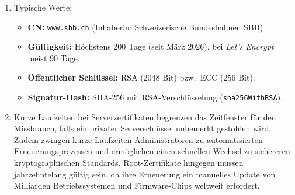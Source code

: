\begin{myexercise}
\begin{myanswer}
\begin{enumerate}
\begin{itemize}
			      \end{itemize}
			\item Typische Werte:
			      \begin{itemize}
				      \item \textbf{\gls{CN}:} \texttt{www.sbb.ch} (Inhaberin: Schweizerische Bundesbahnen SBB)
				      \item \textbf{Gültigkeit:} Höchstens 200 Tage (seit März 2026), bei \emph{Let's Encrypt} meist 90 Tage.
				      \item \textbf{Öffentlicher Schlüssel:} \gls{RSA} (2048 Bit) bzw.\ \gls{ECC} (256 Bit).
				      \item \textbf{Signatur-Hash:} \acrshort{SHA}-256 mit \gls{RSA}-Verschlüsselung (\texttt{sha256WithRSA}).
			      \end{itemize}
			\item Kurze Laufzeiten bei Serverzertifikaten begrenzen das Zeitfenster für den Missbrauch, falls ein privater Serverschlüssel unbemerkt gestohlen wird. Zudem zwingen kurze Laufzeiten Administratoren zu automatisierten Erneuerungsprozessen und ermöglichen einen schnellen Wechsel zu sichereren kryptographischen Standards. Root-Zertifikate hingegen müssen jahrzehntelang gültig sein, da ihre Erneuerung ein manuelles Update von Milliarden Betriebssystemen und Firmware-Chips weltweit erfordert.
		\end{enumerate}
	\end{myanswer}
\end{myexercise}
